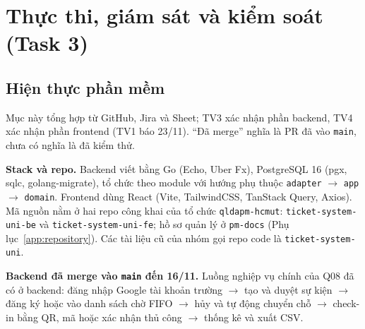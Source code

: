 \chapter{Thực thi, giám sát và kiểm soát (Task 3)}
\label{chap:task3}

\section{Hiện thực phần mềm}
\label{sec:3-1}
Mục này tổng hợp từ GitHub, Jira và Sheet; TV3 xác nhận phần backend, TV4 xác nhận phần frontend (TV1 báo 23/11). \enquote{Đã merge} nghĩa là PR đã vào \texttt{main}, chưa có nghĩa là đã kiểm thử.

\textbf{Stack và repo.} Backend viết bằng Go (Echo, Uber Fx), PostgreSQL 16 (pgx, sqlc, golang-migrate), tổ chức theo module với hướng phụ thuộc \texttt{adapter} $\rightarrow$ \texttt{app} $\rightarrow$ \texttt{domain}. Frontend dùng React (Vite, TailwindCSS, TanStack Query, Axios). Mã nguồn nằm ở hai repo công khai của tổ chức \texttt{qldapm-hcmut}: \texttt{ticket-system-uni-be} và \texttt{ticket-system-uni-fe}; hồ sơ quản lý ở \texttt{pm-docs} (Phụ lục~\ref{app:repository}). Các tài liệu cũ của nhóm gọi repo code là \texttt{ticket-system-uni}.

\textbf{Backend đã merge vào \texttt{main} đến 16/11.} Luồng nghiệp vụ chính của Q08 đã có ở backend: đăng nhập Google tài khoản trường $\rightarrow$ tạo và duyệt sự kiện $\rightarrow$ đăng ký hoặc vào danh sách chờ FIFO $\rightarrow$ hủy và tự động chuyển chỗ $\rightarrow$ check-in bằng QR, mã hoặc xác nhận thủ công $\rightarrow$ thống kê và xuất CSV.

